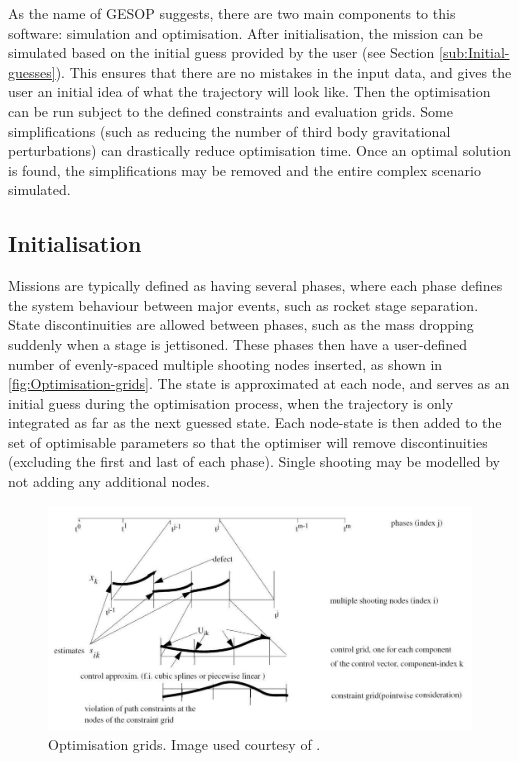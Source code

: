 As the name of GESOP suggests, there are two main components to this software: simulation and optimisation. After initialisation, the mission can be simulated based on the initial guess provided by the user (see Section \ref{sub:Initial-guesses}). This ensures that there are no mistakes in the input data, and gives the user an initial idea of what the trajectory will look like. Then the optimisation can be run subject to the defined constraints and evaluation grids. Some simplifications (such as reducing the number of third body gravitational perturbations) can drastically reduce optimisation time. Once an optimal solution is found, the simplifications may be removed and the entire complex scenario simulated.



\subsection{Initialisation} \label{sub:GESOP-Initialisation}

Missions are typically defined as having several phases, where each phase defines the system behaviour between major events, such as rocket stage separation. State discontinuities are allowed between phases, such as the mass dropping suddenly when a stage is jettisoned. These phases then have a user-defined number of evenly-spaced multiple shooting nodes inserted, as shown in \autoref{fig:Optimisation-grids}. The state is approximated at each node, and serves as an initial guess during the optimisation process, when the trajectory is only integrated as far as the next guessed state. Each node-state is then added to the set of optimisable parameters so that the optimiser will remove discontinuities (excluding the first and last of each phase). Single shooting may be modelled by not adding any additional nodes.

\begin{figure}
\caption{Optimisation grids. Image used courtesy of \textcite{ASTOS_guide}.}
\label{fig:Optimisation-grids}
\centering
\includegraphics[width=\textwidth]{Images/control_nodes.pdf}
\end{figure}

